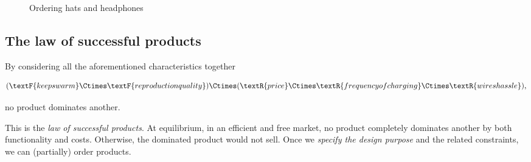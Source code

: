\begin{figure*}[h]
    \caption{Ordering hats and headphones}
\end{figure*}



\subsection{The law of successful products}
By considering all the aforementioned characteristics together
\begin{widepar}
    \begin{equation}\label{eq:all-functionality}
        (\textF{keeps warm}\Ctimes \textF{reproduction quality})
        \Ctimes (\textR{price}\Ctimes \textR{frequency of charging}\Ctimes \textR{wires hassle}),
    \end{equation}
\end{widepar}
no product dominates another.

This is the \emph{law of successful products}.
At equilibrium, in an efficient and free market, no product completely dominates another by both functionality and costs.
Otherwise, the dominated product would not sell.
Once we \emph{specify the design purpose} and the related constraints, we can (partially) order products.

